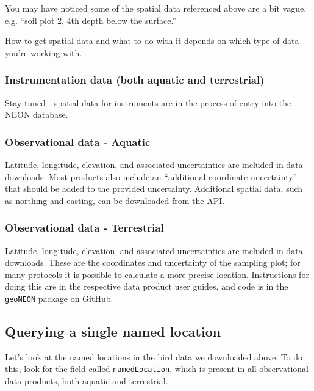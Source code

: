 \documentclass[]{book}
\begin{document}
You may have noticed some of the spatial data referenced above are a bit vague,
e.g. ``soil plot 2, 4th depth below the surface.''

How to get spatial data and what to do with it depends on which type of
data you're working with.

\hypertarget{instrumentation-data-both-aquatic-and-terrestrial}{%
\subsubsection{Instrumentation data (both aquatic and terrestrial)}\label{instrumentation-data-both-aquatic-and-terrestrial}}

Stay tuned - spatial data for instruments are in the process of entry into
the NEON database.

\hypertarget{observational-data---aquatic}{%
\subsubsection{Observational data - Aquatic}\label{observational-data---aquatic}}

Latitude, longitude, elevation, and associated uncertainties are included in
data downloads. Most products also include an ``additional coordinate uncertainty''
that should be added to the provided uncertainty. Additional spatial data, such
as northing and easting, can be downloaded from the API.

\hypertarget{observational-data---terrestrial}{%
\subsubsection{Observational data - Terrestrial}\label{observational-data---terrestrial}}

Latitude, longitude, elevation, and associated uncertainties are included in
data downloads. These are the coordinates and uncertainty of the sampling plot;
for many protocols it is possible to calculate a more precise location.
Instructions for doing this are in the respective data product user guides, and
code is in the \texttt{geoNEON} package on GitHub.

\hypertarget{querying-a-single-named-location}{%
\subsection{Querying a single named location}\label{querying-a-single-named-location}}

Let's look at the named locations in the bird data we downloaded above. To do this,
look for the field called \texttt{namedLocation}, which is present in all observational
data products, both aquatic and terrestrial.
\end{document}
